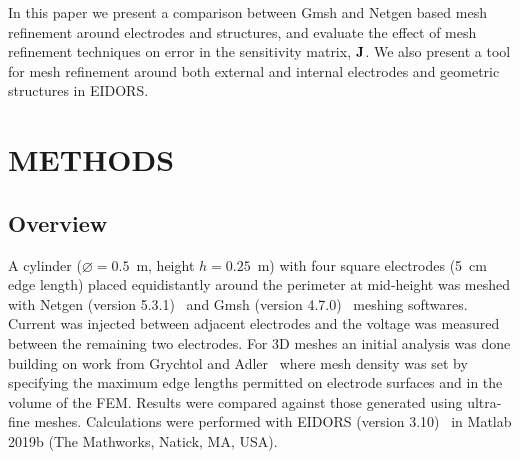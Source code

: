 \documentclass[12pt]{iopart}
\begin{document}

In this paper we present a comparison between Gmsh and 
Netgen based mesh refinement around electrodes and structures, and evaluate the 
effect of mesh refinement techniques on error in  the sensitivity matrix, 
$\bf J$. 
We also present a tool for mesh refinement around both external and internal
electrodes and geometric structures in EIDORS. 

\section{METHODS}
\subsection{Overview}
A cylinder ($\diameter=0.5$~m, height $h=0.25$~m) with four square electrodes 
(5~cm edge length) placed equidistantly around the perimeter at mid-height was
meshed with Netgen (version 5.3.1)~\parencite{schoberl_netgen_1997} and Gmsh 
(version 4.7.0)~\parencite{geuzaine_gmsh_2009}
meshing softwares.
Current was injected between adjacent electrodes and the voltage was measured between the remaining
two electrodes.
For 3D meshes an initial analysis was done building on work from 
Grychtol and Adler~\parencite{grychtol_fem_2013} where mesh density was
set by specifying the maximum edge lengths permitted on electrode surfaces
and in the volume of the FEM.
Results were compared against those generated using ultra-fine meshes. 
Calculations were performed with EIDORS (version 3.10)~\parencite{adler_uses_2006} 
in Matlab 2019b
(The Mathworks, Natick, MA, USA).
\end{document}
